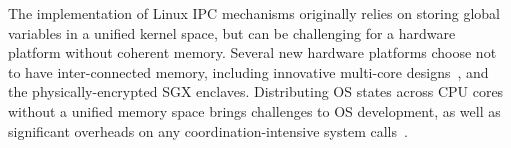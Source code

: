 The implementation of Linux IPC mechanisms originally relies on storing global variables
in a unified kernel space,
but can be challenging for a hardware platform without coherent memory.
Several new hardware platforms choose not to have inter-connected memory,
including innovative multi-core designs~\cite{gschwind2007,cascaval2002evaluation},
and the physically-encrypted SGX enclaves.
Distributing OS states across CPU cores without a unified memory space
brings challenges to OS development,
as well as significant overheads on any coordination-intensive
system calls~\cite{baumann09barrelfish}.









